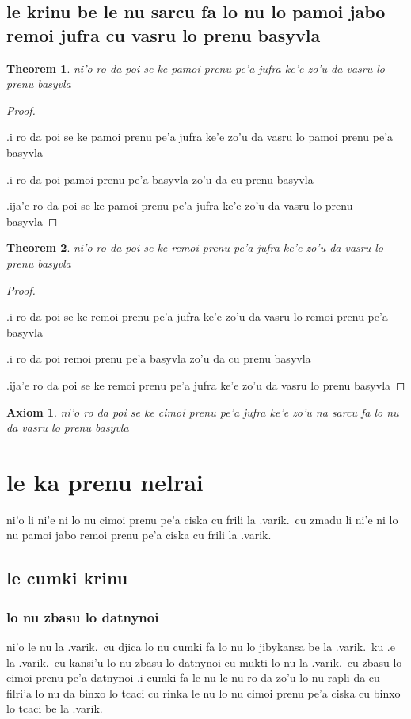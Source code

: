 \documentclass{article}
\newtheorem{thm}{Theorem}
\newtheorem{axiom}{Axiom}
\begin{document}
\subsection{le krinu be le nu sarcu fa lo nu lo pamoi jabo remoi jufra cu vasru lo prenu basyvla}
\begin{thm}
	ni'o ro da poi se ke pamoi prenu pe'a jufra ke'e zo'u da vasru lo prenu basyvla
\end{thm}
\begin{proof}
	${}$

	.i ro da poi se ke pamoi prenu pe'a jufra ke'e zo'u da vasru lo pamoi prenu pe'a basyvla

	.i ro da poi pamoi prenu pe'a basyvla zo'u da cu prenu basyvla

	.ija'e ro da poi se ke pamoi prenu pe'a jufra ke'e zo'u da vasru lo prenu basyvla
\end{proof}
\begin{thm}
	ni'o ro da poi se ke remoi prenu pe'a jufra ke'e zo'u da vasru lo prenu basyvla
\end{thm}
\begin{proof}
	${ }$

	.i ro da poi se ke remoi prenu pe'a jufra ke'e zo'u da vasru lo remoi prenu pe'a basyvla

	.i ro da poi remoi prenu pe'a basyvla zo'u da cu prenu basyvla

	.ija'e ro da poi se ke remoi prenu pe'a jufra ke'e zo'u da vasru lo prenu basyvla
\end{proof}
\begin{axiom}
	ni'o ro da poi se ke cimoi prenu pe'a jufra ke'e zo'u na sarcu fa lo nu da vasru lo prenu basyvla
\end{axiom}

\section{le ka prenu nelrai}
ni'o li ni'e ni lo nu cimoi prenu pe'a ciska cu frili la .varik.\ cu zmadu li ni'e ni lo nu pamoi jabo remoi prenu pe'a ciska cu frili la .varik.

\subsection{le cumki krinu}

\subsubsection{lo nu zbasu lo datnynoi}
ni'o le nu la .varik.\ cu djica lo nu cumki fa lo nu lo jibykansa be la .varik.\ ku .e la .varik.\ cu kansi'u lo nu zbasu lo datnynoi cu mukti lo nu la .varik.\ cu zbasu lo cimoi prenu pe'a datnynoi  .i cumki fa le nu le nu ro da zo'u lo nu rapli da cu filri'a lo nu da binxo lo tcaci cu rinka le nu lo nu cimoi prenu pe'a ciska cu binxo lo tcaci be la .varik.
\end{document}
